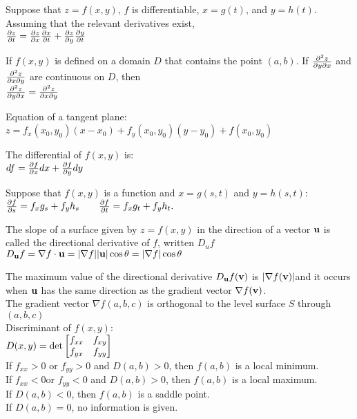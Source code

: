 \documentclass[12pt,landscape]{article}
\newcommand{\tab}{\hspace{.02\textwidth}}
\begin{document}
\begin{multicols}{3}
Suppose that $z=f(x,y)$, $f$ is differentiable, $x=g(t)$, and $y=h(t)$. Assuming that the relevant derivatives exist,\\
\tab $\pdv{z}{t} = \pdv{z}{x}\pdv{x}{t}+\pdv{z}{y}\pdv{y}{t}$

If $f(x,y)$ is defined on a domain $D$ that contains the point $(a,b)$. If $\pdv{z}{y}{x}$ and $\pdv{z}{x}{y}$ are continuous on $D$, then\\
\tab $\pdv{z}{y}{x} = \pdv{z}{x}{y}$
	
Equation of a tangent plane:\\
\tab $z=f_x(x_0,y_0)(x-x_0)+f_y(x_0,y_0)(y-y_0)+f(x_0,y_0)$

The differential of $f(x,y)$ is:\\
\tab $df = \pdv{f}{x}dx + \pdv{f}{y}dy$

Suppose that $f(x,y)$ is a function and $x=g(s,t)$ and $y=h(s,t)$:\\
\tab $\pdv{f}{s}=f_xg_s+f_yh_s\qquad \pdv{f}{t}=f_xg_t+f_yh_t.$

The slope of a surface given by $z=f(x,y)$ in the direction of a vector $\vb{u}$ is called the directional derivative of $f$, written $D_uf$\\
\tab $D_{\vb{u}}f=\nabla f\cdot \vb{u}=|\nabla f||\vb{u}|\cos\theta=
	|\nabla f|\cos\theta$

The maximum value of the directional derivative $D_{\vb{u}} f(\vb{v})$ is $|\nabla f(\vb{v})|$and it occurs when $\vb{u}$ has the same direction as the gradient vector $\nabla f(\vb{v})$.\\
\vspace{0.2cm}
The gradient vector $\nabla f(a,b,c)$ is orthogonal to the level surface $S$ through $(a,b,c)$\\
\vspace{0.2cm}
Discriminant of $f(x,y)$:\\
\tab $D(x,y) = \det\mqty[f_{xx}& f_{xy}\\f_{yx} & f_{yy} ]$\\
\vspace{0.2cm}
If $f_{xx} > 0$ or $f_{yy} > 0$ and $D(a,b) > 0$, then $f(a,b)$ is a local minimum.\\
If $f_{xx} < 0 $or $f_{yy} < 0$ and $D(a,b) > 0$, then $f(a,b)$ is a local maximum.\\
If $D(a,b) < 0$, then $f(a,b)$ is a saddle point.\\
If $D(a,b) = 0$, no information is given.\\


\end{multicols}
\end{document}
